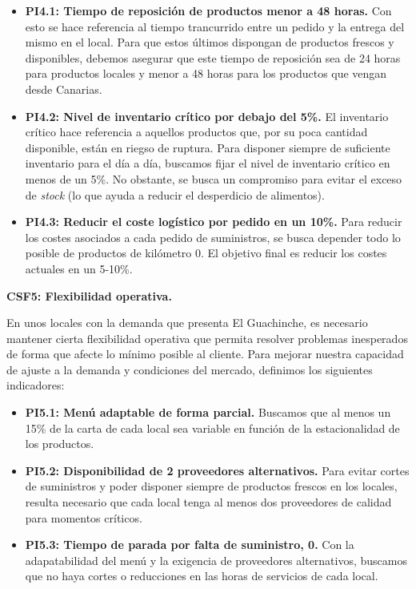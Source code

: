 \documentclass[12pt]{opticajnl}
\begin{document}
\begin{itemize}
    \item \textbf{PI4.1: Tiempo de reposición de productos menor a 48 horas.} Con esto se hace referencia al tiempo trancurrido entre un pedido y la entrega del mismo en el local. Para que estos últimos dispongan de productos frescos y disponibles, debemos asegurar que este tiempo de reposición sea de 24 horas para productos locales y menor a 48 horas para los productos que vengan desde Canarias. 
    \item \textbf{PI4.2: Nivel de inventario crítico por debajo del 5\%.} El inventario crítico hace referencia a aquellos productos que, por su poca cantidad disponible, están en riegso de ruptura. Para disponer siempre de suficiente inventario para el día a día, buscamos fijar el nivel de inventario crítico en menos de un 5\%. No obstante, se busca un compromiso para evitar el exceso de \textit{stock} (lo que ayuda a reducir el desperdicio de alimentos).
    \item \textbf{PI4.3: Reducir el coste logístico por pedido en un 10\%.} Para reducir los costes asociados a cada pedido de suministros, se busca depender todo lo posible de productos de kilómetro 0. El objetivo final es reducir los costes actuales en un 5-10\%.
\end{itemize}

\textbf{CSF5: Flexibilidad operativa.}

En unos locales con la demanda que presenta El Guachinche, es necesario mantener cierta flexibilidad operativa que permita resolver problemas inesperados de forma que afecte lo mínimo posible al cliente. Para mejorar nuestra capacidad de ajuste a la demanda y condiciones del mercado, definimos los siguientes indicadores:

\begin{itemize}
    \item \textbf{PI5.1: Menú adaptable de forma parcial.} Buscamos que al menos un 15\% de la carta de cada local sea variable en función de la estacionalidad de los productos. 
    \item \textbf{PI5.2: Disponibilidad de 2 proveedores alternativos.} Para evitar cortes de suministros y poder disponer siempre de productos frescos en los locales, resulta necesario que cada local tenga al menos dos proveedores de calidad para momentos críticos.
    \item \textbf{PI5.3: Tiempo de parada por falta de suministro, 0.} Con la adapatabilidad del menú y la exigencia de proveedores alternativos, buscamos que no haya cortes o reducciones en las horas de servicios de cada local.    
\end{itemize}
\end{document}
